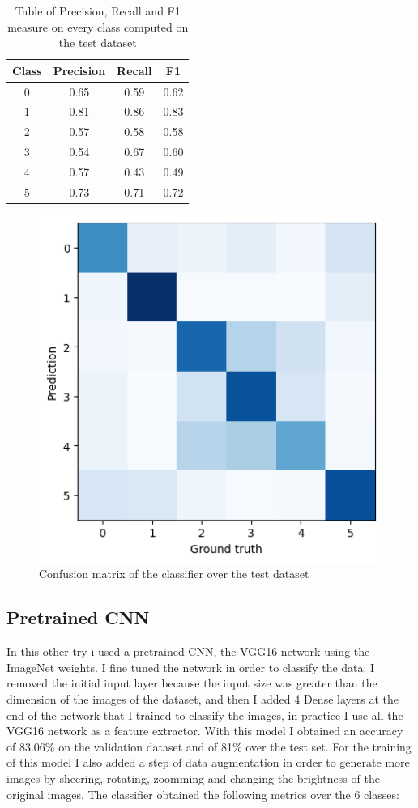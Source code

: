 \documentclass[12pt,journal,compsoc]{IEEEtran}
\begin{document}
\begin{table}[ht]
	\centering
	\begin{tabular}{c c c c }
		Class & Precision & Recall & F1  \\
		\hline
		0 & 0.65 &0.59 &0.62     \\
		1 & 0.81 &0.86 &0.83       \\
		2 & 0.57 &0.58 &0.58       \\
		3 & 0.54 &0.67 &0.60       \\ 
		4 & 0.57 &0.43 &0.49       \\
		5 & 0.73 &0.71 &0.72       \\
		
	\end{tabular}
	\caption{Table of Precision, Recall and F1 measure on every class computed on the test dataset}
	\end{table}
	\begin{figure}[H]
		\begin{center}
		\includegraphics[scale=.75]{./images/confmat_cnn.png}
		\end{center}
		\caption{Confusion matrix of the classifier over the test dataset}
	\end{figure}
\subsection{Pretrained CNN}
In this other try i used a pretrained CNN, the VGG16\cite{VGG16} network using the ImageNet weights. I fine tuned the network in order to classify the data: I removed the initial input layer because the input size was greater than the dimension of the images of the dataset, and then I added 4 Dense layers at the end of the network that I trained to classify the images, in practice I use all the VGG16 network as a feature extractor. With this model I obtained an accuracy of 83.06\% on the validation dataset and of 81\% over the test set.
For the training of this model I also added a step of data augmentation in order to generate more images by sheering, rotating, zoomming and changing the brightness of the original images.
The classifier obtained the following metrics over the 6 classes:
\end{document}
